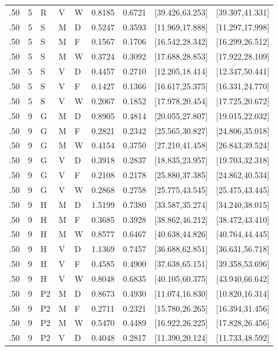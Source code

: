 {\begin{longtable}{rrlllrrll}
.50 & 5 & R & V & W & 0.8185 & 0.6721 & [39.426,63.253] & [39.307,41.331]\\
.50 & 5 & S & M & D & 0.5247 & 0.3593 & [11.969,17.888] & [11.297,17.998]\\
.50 & 5 & S & M & F & 0.1567 & 0.1706 & [16.542,28.342] & [16.299,26.512]\\
.50 & 5 & S & M & W & 0.3724 & 0.3092 & [17.688,28.853] & [17.922,28.109]\\
.50 & 5 & S & V & D & 0.4457 & 0.2710 & [12.205,18.414] & [12.347,50.441]\\
.50 & 5 & S & V & F & 0.1427 & 0.1366 & [16.617,25.375] & [16.331,24.770]\\
.50 & 5 & S & V & W & 0.2067 & 0.1852 & [17.978,20.454] & [17.725,20.672]\\
.50 & 9 & G & M & D & 0.8905 & 0.4814 & [20.055,27.807] & [19.015,22.032]\\
.50 & 9 & G & M & F & 0.2821 & 0.2342 & [25.565,30.827] & [24.806,35.018]\\
.50 & 9 & G & M & W & 0.4154 & 0.3750 & [27.210,41.458] & [26.843,39.524]\\
.50 & 9 & G & V & D & 0.3918 & 0.2837 & [18.835,23.957] & [19.703,32.318]\\
.50 & 9 & G & V & F & 0.2108 & 0.2178 & [25.880,37.385] & [24.862,40.534]\\
.50 & 9 & G & V & W & 0.2868 & 0.2758 & [25.775,43.545] & [25.475,43.445]\\
.50 & 9 & H & M & D & 1.5199 & 0.7380 & [33.587,35.274] & [34.240,38.015]\\
.50 & 9 & H & M & F & 0.3685 & 0.3928 & [38.862,46.212] & [38.472,43.410]\\
.50 & 9 & H & M & W & 0.8577 & 0.6467 & [40.638,44.826] & [40.764,44.445]\\
.50 & 9 & H & V & D & 1.1369 & 0.7457 & [36.688,62.851] & [36.631,56.718]\\
.50 & 9 & H & V & F & 0.4585 & 0.4900 & [37.638,65.151] & [39.358,53.696]\\
.50 & 9 & H & V & W & 0.8048 & 0.6835 & [40.105,60.375] & [43.940,66.642]\\
.50 & 9 & P2 & M & D & 0.8673 & 0.4930 & [11.074,16.830] & [10.820,16.314]\\
.50 & 9 & P2 & M & F & 0.2711 & 0.2321 & [15.780,26.265] & [16.394,31.456]\\
.50 & 9 & P2 & M & W & 0.5470 & 0.4489 & [16.922,26.225] & [17.828,26.456]\\
.50 & 9 & P2 & V & D & 0.4048 & 0.2817 & [11.390,20.124] & [11.733,48.592]\\

\end{longtable}}
